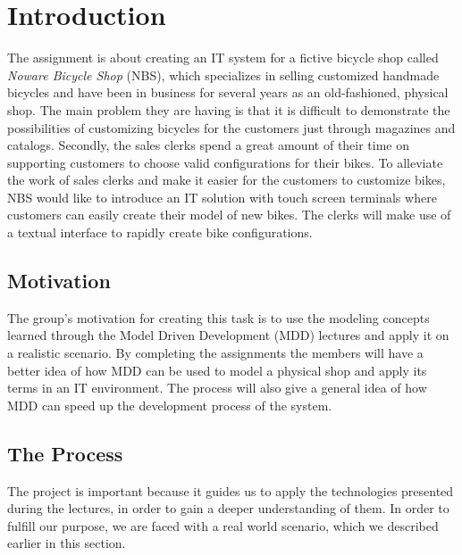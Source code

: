 \section{Introduction}
\label{sec.introduction}
\noindent The assignment is about creating an IT system for a fictive bicycle
shop called \emph{Noware Bicycle Shop} (NBS), which specializes in selling
customized handmade bicycles and have been in business for several years as an
old-fashioned, physical shop. The main problem they are having is that it is
difficult to demonstrate the possibilities of customizing bicycles for the
customers just through magazines and catalogs. Secondly, the sales clerks spend
a great amount of their time on supporting customers to choose valid
configurations for their bikes. To alleviate the work of sales clerks and make
it easier for the customers to customize bikes, NBS would like to introduce an
IT solution with touch screen terminals where customers can easily create their
model of new bikes. The clerks will make use of a textual interface to rapidly
create bike configurations.

\subsection{Motivation}
\noindent The group's motivation for creating this task is to use the modeling
concepts learned through the Model Driven Development (MDD) lectures and apply
it on a realistic scenario. By completing the assignments the members will
have a better idea of how MDD can be used to model a physical shop and apply its
terms in an IT environment.  The process will also give a general idea of how
MDD can speed up the development process of the system.

\subsection{The Process}
\noindent The project is important because it guides us to apply the
technologies presented during the lectures, in order to gain a deeper
understanding of them. In order to fulfill our purpose, we are faced with a real
world scenario, which we described earlier in this section.\\

